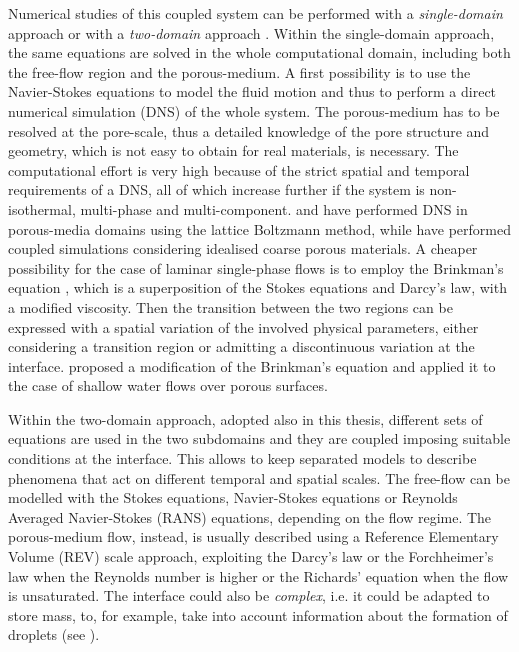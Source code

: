 Numerical studies of this coupled system can be performed with a 
\emph{single-domain} approach or with a \emph{two-domain} approach 
\cite{tesi:fetzer}.
Within the single-domain approach, the same equations are solved in the whole 
computational domain, including both the free-flow region and the 
porous-medium. A first possibility is to use the Navier-Stokes equations to model the 
fluid motion and thus to perform a direct numerical simulation (DNS) of the 
whole system. The porous-medium has to be resolved at the pore-scale, thus a 
detailed knowledge of the pore structure and geometry, which is not easy to obtain for real 
materials, is necessary. The computational effort is very high because 
of the strict spatial and temporal requirements of a DNS,
all of which increase further if the system
is non-isothermal, multi-phase and multi-component. \textcite{intro:dns} and \textcite{intro:dns2} have performed DNS in 
porous-media domains using the lattice Boltzmann method, while \textcite{intro:yang} have performed coupled simulations considering idealised coarse porous materials.
A cheaper possibility for the case of laminar single-phase flows is to employ the Brinkman's equation 
\cite{intro:brinkman}, which is a superposition of the Stokes equations and 
Darcy's law, with a modified viscosity. %
Then the transition between the two 
regions can be expressed with a spatial variation of the involved physical 
parameters, either considering a transition region or admitting a discontinuous 
variation at the interface. \textcite{intro:shavit} proposed a modification of 
the Brinkman's equation and applied it to the case of shallow water flows over 
porous surfaces.

Within the two-domain approach, adopted also in this thesis, different sets of 
equations are used in the two subdomains and they are coupled imposing suitable 
conditions at the interface. This allows to keep separated models to describe phenomena that act on different temporal and spatial scales. The free-flow can be modelled with the Stokes 
equations, Navier-Stokes equations or Reynolds Averaged Navier-Stokes (RANS) equations, depending on the flow 
regime. The porous-medium flow, instead, is usually described using a Reference Elementary Volume (REV) scale approach, exploiting the 
Darcy's law or the Forchheimer's law when the Reynolds number is higher or the 
Richards' equation when the flow is unsaturated. The interface could also be \emph{complex}, i.e. it could be 
adapted to store mass, to, for example, take into account information about the formation of droplets
(see \cite{tesi:baber}).

